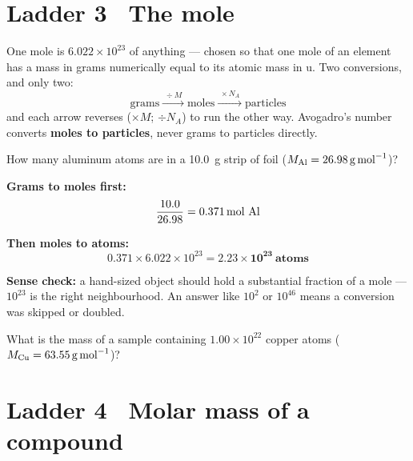 \documentclass{apchem-worksheet}
\begin{document}
\section*{\sffamily Ladder 3 \textbullet\ The mole}

One mole is $6.022\times10^{23}$ of anything --- chosen so that one mole
of an element has a mass in grams numerically equal to its atomic mass in
u. Two conversions, and only two:
\[ \text{grams} \xrightarrow{\;\div M\;} \text{moles}
   \xrightarrow{\;\times N_A\;} \text{particles} \]
and each arrow reverses ($\times M$; $\div N_A$) to run the other way.
Avogadro's number converts \textbf{moles to particles}, never grams to
particles directly.

\begin{workedexample}
How many aluminum atoms are in a \SI{10.0}{\gram} strip of foil
($M_{\ce{Al}} = \SI{26.98}{\gram\per\mole}$)?

\textbf{Grams to moles first:}
\[ \frac{10.0}{26.98} = \SI{0.371}{\mole}~\ce{Al} \]

\textbf{Then moles to atoms:}
\[ 0.371 \times 6.022\times10^{23} = \mathbf{2.23\times10^{23}~atoms} \]

\textbf{Sense check:} a hand-sized object should hold a substantial
fraction of a mole --- $10^{23}$ is the right neighbourhood. An answer
like $10^{2}$ or $10^{46}$ means a conversion was skipped or doubled.
\end{workedexample}

\begin{yourturn}
What is the mass of a sample containing $1.00\times10^{22}$ copper atoms
($M_{\ce{Cu}} = \SI{63.55}{\gram\per\mole}$)? \workspace[2.8cm]
\end{yourturn}

\section*{\sffamily Ladder 4 \textbullet\ Molar mass of a compound}
\end{document}
